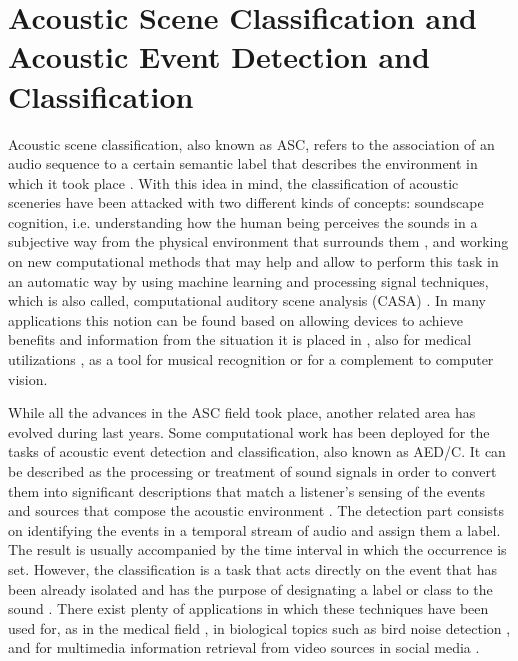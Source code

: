 
\section{Acoustic Scene Classification and Acoustic Event Detection and Classification}

	Acoustic scene classification, also known as ASC, refers to the association of an audio sequence to a certain semantic label that describes the environment in which it took place \cite{Barchiesi2015}. With this idea in mind, the classification of acoustic sceneries have been attacked with two different kinds of concepts: soundscape cognition, i.e. understanding how the human being perceives the sounds in a subjective way from the physical environment that surrounds them  \cite{Dubois2006}, and working on new computational methods that may help and allow to perform this task in an automatic way by using machine learning and processing signal techniques, which is also called, computational auditory scene analysis (CASA) \cite{Wang2006}. In many applications this notion  can be found based on allowing devices to achieve benefits and information from the situation it is placed in \cite{Eronen2006}, also for medical utilizations \cite{Bahoura2009}, as a tool for musical recognition \cite{Van2013} or for a complement to computer vision.
	
	While all the advances in the ASC field took place, another related area has evolved during last years. Some computational work has been deployed for the tasks of acoustic event detection and classification, also known as AED/C. It can be described as the processing or treatment of sound signals in order to convert them into significant descriptions that match a listener's sensing of the events and sources that compose the acoustic environment \cite{Temko2009}. The detection part consists on identifying the events in a temporal stream of audio and assign them a label. The result is usually accompanied by the time interval in which the occurrence is set. However, the classification is a task that acts directly on the event that has been already isolated and has the purpose of designating a label or class to the sound \cite{Temko2007}. There exist plenty of applications in which these techniques have been used for, as in the medical field \cite{Bahoura2010}, in biological topics such as bird noise detection \cite{Potamitis2014}, and for multimedia information retrieval from video sources in social media \cite{Wang2016}.

